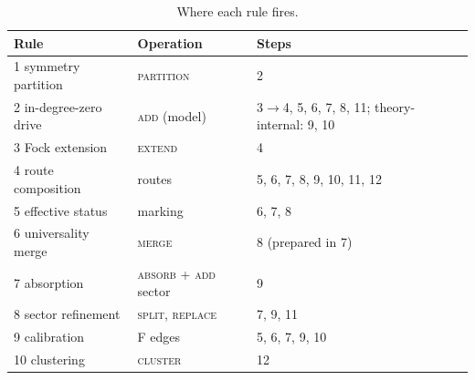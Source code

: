 \begin{table}[htbp]\centering\small
\caption{Where each rule fires.}\label{tab:rules}
\begin{tabular}{@{}lll@{}}\toprule
Rule & Operation & Steps \\\midrule
1 symmetry partition & \textsc{partition} & 2 \\
2 in-degree-zero drive & \textsc{add} (model) & 3$\to$4, 5, 6, 7, 8, 11; theory-internal: 9, 10 \\
3 Fock extension & \textsc{extend} & 4 \\
4 route composition & routes & 5, 6, 7, 8, 9, 10, 11, 12 \\
5 effective status & marking & 6, 7, 8 \\
6 universality merge & \textsc{merge} & 8 (prepared in 7) \\
7 absorption & \textsc{absorb} + \textsc{add} sector & 9 \\
8 sector refinement & \textsc{split}, \textsc{replace} & 7, 9, 11 \\
9 calibration & F edges & 5, 6, 7, 9, 10 \\
10 clustering & \textsc{cluster} & 12 \\\bottomrule
\end{tabular}
\end{table}

